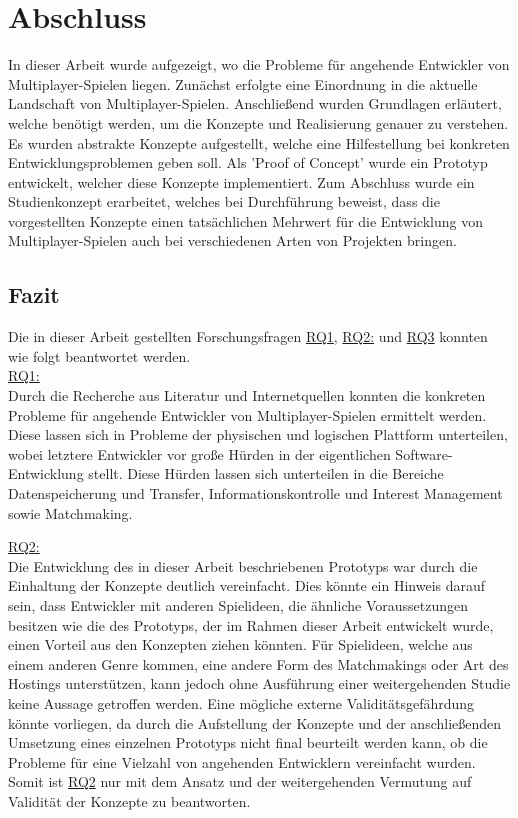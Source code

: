 \chapter{Abschluss}
\label{sec:abschluss}

In dieser Arbeit wurde aufgezeigt, wo die Probleme für angehende Entwickler von Multiplayer-Spielen liegen. Zunächst erfolgte eine Einordnung in die aktuelle Landschaft von Multiplayer-Spielen. Anschließend wurden Grundlagen erläutert, welche benötigt werden, um die Konzepte und Realisierung genauer zu verstehen. Es wurden abstrakte Konzepte aufgestellt, welche eine Hilfestellung bei konkreten Entwicklungsproblemen geben soll. Als 'Proof of Concept' wurde ein Prototyp entwickelt, welcher diese Konzepte implementiert. Zum Abschluss wurde ein Studienkonzept erarbeitet, welches bei Durchführung beweist, dass die vorgestellten Konzepte einen tatsächlichen Mehrwert für die Entwicklung von Multiplayer-Spielen auch bei verschiedenen Arten von Projekten bringen.

\section{Fazit}

Die in dieser Arbeit gestellten Forschungsfragen \hyperref[RQ1]{RQ1}, \hyperref[RQ2]{RQ2:} und \hyperref[RQ3]{RQ3} konnten wie folgt beantwortet werden. \\
\hyperref[RQ1]{RQ1:} \\
Durch die Recherche aus Literatur und Internetquellen konnten die konkreten Probleme für angehende Entwickler von Multiplayer-Spielen ermittelt werden. Diese lassen sich in Probleme der physischen und logischen Plattform unterteilen, wobei letztere Entwickler vor große Hürden in der eigentlichen Software-Entwicklung stellt. Diese Hürden lassen sich unterteilen in die Bereiche Datenspeicherung und Transfer, Informationskontrolle und Interest Management sowie Matchmaking.

\hyperref[RQ2]{RQ2:} \\
Die Entwicklung des in dieser Arbeit beschriebenen Prototyps war durch die Einhaltung der Konzepte deutlich vereinfacht. Dies könnte ein Hinweis darauf sein, dass Entwickler mit anderen Spielideen, die ähnliche Voraussetzungen besitzen wie die des Prototyps, der im Rahmen dieser Arbeit entwickelt wurde, einen Vorteil aus den Konzepten ziehen könnten. Für Spielideen, welche aus einem anderen Genre kommen, eine andere Form des Matchmakings oder Art des Hostings unterstützen, kann jedoch ohne Ausführung einer weitergehenden Studie keine Aussage getroffen werden. Eine mögliche externe Validitätsgefährdung könnte vorliegen, da durch die Aufstellung der Konzepte und der anschließenden Umsetzung eines einzelnen Prototyps nicht final beurteilt werden kann, ob die Probleme für eine Vielzahl von angehenden Entwicklern vereinfacht wurden. Somit ist \hyperref[RQ2]{RQ2} nur mit dem Ansatz und der weitergehenden Vermutung auf Validität der Konzepte zu beantworten.

